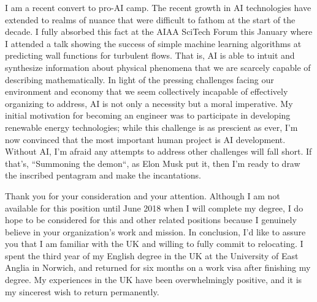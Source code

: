 \documentclass[10pt,a4paper,sans]{moderncv}        %
\begin{document}
I am a recent convert to pro-AI camp.
The recent growth in AI technologies have extended to realms of nuance that were difficult to fathom at the start of the decade.
I fully absorbed this fact at the AIAA SciTech Forum this January where I attended a talk showing the success of simple machine learning algorithms at predicting wall functions for turbulent flows.
That is, AI is able to intuit and synthesize information about physical phenomena that we are scarcely capable of describing mathematically.
In light of the pressing challenges facing our environment and economy that we seem collectively incapable of effectively organizing to address, AI is not only a necessity but a moral imperative.
My initial motivation for becoming an engineer was to participate in developing renewable energy technologies; while this challenge is as prescient as ever, I'm now convinced that the most important human project is AI development.
Without AI, I'm afraid any attempts to address other challenges will fall short.
If that's, ``Summoning the demon``, as Elon Musk put it, then I'm ready to draw the inscribed pentagram and make the incantations.

Thank you for your consideration and your attention.  
Although I am not available for this position until June 2018 when I will complete my degree, I do hope to be considered for this and other related positions because I genuinely believe in your organization's work and mission. 
In conclusion, I'd like to assure you that I am familiar with the UK and willing to fully commit to relocating.
I spent the third year of my English degree in the UK at the University of East Anglia in Norwich, and returned for six months on a work visa after finishing my degree.
My experiences in the UK have been overwhelmingly positive, and it is my sincerest wish to return permanently.

\vspace{2mm}

\makeletterclosing
\end{document}
